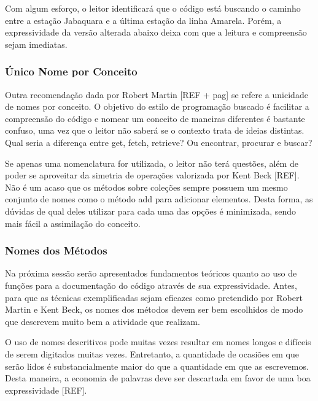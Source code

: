 

Com algum esforço, o leitor identificará que o código está buscando o caminho entre a estação Jabaquara e a última estação da linha Amarela. Porém, a expressividade da versão alterada abaixo deixa com que a leitura e compreensão sejam imediatas.




\subsubsection{Único Nome por Conceito}
Outra recomendação dada por Robert Martin [REF + pag] se refere a unicidade de nomes por conceito. O objetivo do estilo de programação buscado é facilitar a compreensão do código e nomear um conceito de maneiras diferentes é bastante confuso, uma vez que o leitor não saberá se o contexto trata de ideias distintas. Qual seria a diferença entre get, fetch, retrieve? Ou encontrar, procurar e buscar?
	
Se apenas uma nomenclatura for utilizada, o leitor não terá questões, além de poder se aproveitar da simetria de operações valorizada por Kent Beck [REF]. Não é um acaso que os métodos sobre coleções sempre possuem um mesmo conjunto de nomes como o método add para adicionar elementos. Desta forma, as dúvidas de qual deles utilizar para cada uma das opções é minimizada, sendo mais fácil a assimilação do conceito.

\subsubsection{Nomes dos Métodos}
Na próxima sessão serão apresentados fundamentos teóricos quanto ao uso de funções para a documentação do código através de sua expressividade. Antes, para que as técnicas exemplificadas sejam eficazes como pretendido por Robert Martin e Kent Beck, os nomes dos métodos devem ser bem escolhidos de modo que descrevem muito bem a atividade que realizam.
	
O uso de nomes descritivos pode muitas vezes resultar em nomes longos e difíceis de serem digitados muitas vezes. Entretanto, a quantidade de ocasiões em que serão lidos é substancialmente maior do que a quantidade em que as escrevemos. Desta maneira, a economia de palavras deve ser descartada em favor de uma boa expressividade [REF].
	
